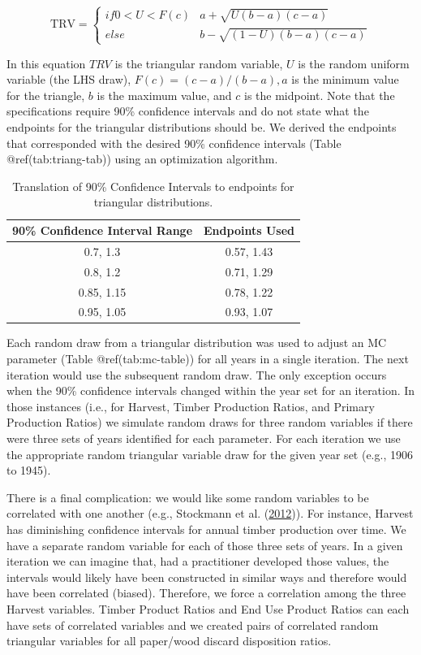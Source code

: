 \documentclass[
  openany]{book}
\begin{document}
\[   \text{TRV} =
  \begin{cases}
    if 0 < U < F(c)       & a + \sqrt{U(b-a)(c-a)}\\
    else  & b - \sqrt{(1-U)(b-a)(c-a)}
  \end{cases} \]

In this equation \(TRV\) is the triangular random variable, \(U\) is the
random uniform variable (the LHS draw), \(F(c)=(c-a)/(b-a), a\) is the
minimum value for the triangle, \(b\) is the maximum value, and \(c\) is
the midpoint. Note that the specifications require 90\% confidence
intervals and do not state what the endpoints for the triangular
distributions should be. We derived the endpoints that corresponded with
the desired 90\% confidence intervals (Table @ref(tab:triang-tab)) using
an optimization algorithm.

\begin{table}

\caption{\label{tab:triang-tab}Translation of 90\% Confidence Intervals to endpoints for triangular distributions.}
\centering
\begin{tabular}[t]{cc}
\toprule
90\% Confidence Interval Range & Endpoints Used\\
\midrule
0.7, 1.3 & 0.57, 1.43\\
0.8, 1.2 & 0.71, 1.29\\
0.85, 1.15 & 0.78, 1.22\\
0.95, 1.05 & 0.93, 1.07\\
\bottomrule
\end{tabular}
\end{table}

Each random draw from a triangular distribution was used to adjust an MC
parameter (Table @ref(tab:mc-table)) for all years in a single
iteration. The next iteration would use the subsequent random draw. The
only exception occurs when the 90\% confidence intervals changed within
the year set for an iteration. In those instances (i.e., for Harvest,
Timber Production Ratios, and Primary Production Ratios) we simulate
random draws for three random variables if there were three sets of
years identified for each parameter. For each iteration we use the
appropriate random triangular variable draw for the given year set
(e.g., 1906 to 1945).

There is a final complication: we would like some random variables to be
correlated with one another (e.g., Stockmann et al.
(\protect\hyperlink{ref-stockmann2012}{2012})). For instance, Harvest
has diminishing confidence intervals for annual timber production over
time. We have a separate random variable for each of those three sets of
years. In a given iteration we can imagine that, had a practitioner
developed those values, the intervals would likely have been constructed
in similar ways and therefore would have been correlated (biased).
Therefore, we force a correlation among the three Harvest variables.
Timber Product Ratios and End Use Product Ratios can each have sets of
correlated variables and we created pairs of correlated random
triangular variables for all paper/wood discard disposition ratios.
\end{document}
